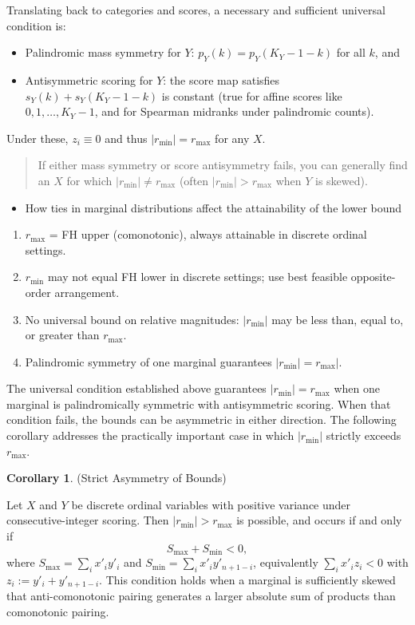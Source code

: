 \documentclass[
  12pt,
]{article}
\providecommand{\tightlist}{%
  \setlength{\itemsep}{0pt}\setlength{\parskip}{0pt}}
\theoremstyle{plain}
\theoremstyle{definition}
\newtheorem{corollary}{Corollary}
\theoremstyle{remark}
\begin{document}
Translating back to categories and scores, a necessary and sufficient
universal condition is:

\begin{itemize}
\item
  Palindromic mass symmetry for \(Y\): \(p_Y(k)=p_Y(K_Y-1-k)\) for all
  \(k\), and
\item
  Antisymmetric scoring for \(Y\): the score map satisfies
  \(s_Y(k)+s_Y(K_Y-1-k)\) is constant (true for affine scores like
  \(0,1,\dots,K_Y-1\), and for Spearman midranks under palindromic
  counts).
\end{itemize}

Under these, \(z_i\equiv 0\) and thus \(|r_{\min}|=r_{\max}\) for any
\(X\).

\begin{quote}
If either mass symmetry or score antisymmetry fails, you can generally
find an \(X\) for which \(|r_{\min}|\ne r_{\max}\) (often
\(|r_{\min}|>r_{\max}\) when \(Y\) is skewed).
\end{quote}

\begin{itemize}
\tightlist
\item
  How ties in marginal distributions affect the attainability of the
  lower bound
\end{itemize}

\begin{enumerate}
\def\labelenumi{\arabic{enumi}.}
\tightlist
\item
  \(r_{\max}\) = FH upper (comonotonic), always attainable in discrete
  ordinal settings.
\item
  \(r_{\min}\) may not equal FH lower in discrete settings; use best
  feasible opposite-order arrangement.
\item
  No universal bound on relative magnitudes: \(|r_{\min}|\) may be less
  than, equal to, or greater than \(r_{\max}\).
\item
  Palindromic symmetry of one marginal guarantees
  \(|r_{\min}| = r_{\max}|\).
\end{enumerate}

The universal condition established above guarantees
\(|r_{\min}| = r_{\max}\) when one marginal is palindromically symmetric
with antisymmetric scoring. When that condition fails, the bounds can be
asymmetric in either direction. The following corollary addresses the
practically important case in which \(|r_{\min}|\) strictly exceeds
\(r_{\max}\).

\label{corr-asymmetry}
\begin{corollary}{(Strict Asymmetry of Bounds)}

Let $X$ and $Y$ be discrete ordinal variables with positive variance under consecutive-integer scoring.
Then $|r_{\min}| > r_{\max}$ is possible, and occurs if and only if
$$
S_{\max} + S_{\min} < 0,
$$
where $S_{\max} = \sum_i x'_i y'_i$ and $S_{\min} = \sum_i x'_i y'_{n+1-i}$, equivalently $\sum_i x'_i z_i < 0$ with $z_i := y'_i + y'_{n+1-i}$.
This condition holds when a marginal is sufficiently skewed that anti-comonotonic pairing generates a larger absolute sum of products than comonotonic pairing.
\end{corollary}
\end{document}
